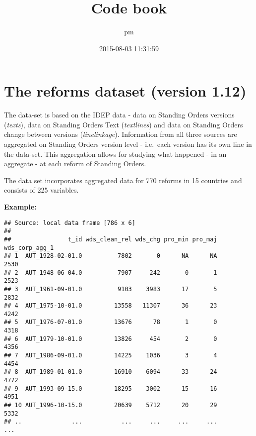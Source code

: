 \documentclass[]{article}
\title{Code book}
\author{pm}
\date{2015-08-03 11:31:59}
\newenvironment{Shaded}{\begin{snugshade}}{\end{snugshade}}
\newcommand{\KeywordTok}[1]{\textcolor[rgb]{0.13,0.29,0.53}{\textbf{{#1}}}}
\newcommand{\StringTok}[1]{\textcolor[rgb]{0.31,0.60,0.02}{{#1}}}
\newcommand{\NormalTok}[1]{{#1}}
\begin{document}
\maketitle


\section{The reforms dataset (version
1.12)}\label{the-reforms-dataset-version-1.12}

The data-set is based on the IDEP data - data on Standing Orders
versions (\emph{texts}), data on Standing Orders Text (\emph{textlines})
and data on Standing Orders change between versions
(\emph{linelinkage}). Information from all three sources are aggregated
on Standing Orders version level - i.e.~each version has its own line in
the data-set. This aggregation allows for studying what happened - in an
aggregate - at each reform of Standing Orders.

The data set incorporates aggregated data for 770 reforms in 15
countries and consists of 225 variables.

\textbf{Example:}

\begin{Shaded}
\end{Shaded}

\begin{verbatim}
## Source: local data frame [786 x 6]
## 
##                t_id wds_clean_rel wds_chg pro_min pro_maj wds_corp_agg_1
## 1  AUT_1928-02-01.0          7802       0      NA      NA           2530
## 2  AUT_1948-06-04.0          7907     242       0       1           2523
## 3  AUT_1961-09-01.0          9103    3983      17       5           2832
## 4  AUT_1975-10-01.0         13558   11307      36      23           4242
## 5  AUT_1976-07-01.0         13676      78       1       0           4318
## 6  AUT_1979-10-01.0         13826     454       2       0           4356
## 7  AUT_1986-09-01.0         14225    1036       3       4           4454
## 8  AUT_1989-01-01.0         16910    6094      33      24           4772
## 9  AUT_1993-09-15.0         18295    3002      15      16           4951
## 10 AUT_1996-10-15.0         20639    5712      20      29           5332
## ..              ...           ...     ...     ...     ...            ...
\end{verbatim}
\end{document}
